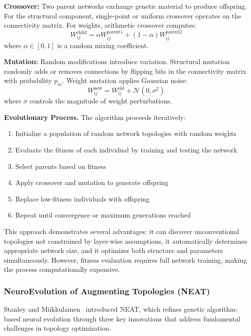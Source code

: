 \textbf{Crossover:} Two parent networks exchange genetic material to produce offspring. For the structural component, single-point or uniform crossover operates on the connectivity matrix. For weights, arithmetic crossover computes:
\begin{equation}
W_{ij}^{\text{child}} = \alpha W_{ij}^{\text{parent1}} + (1-\alpha) W_{ij}^{\text{parent2}}
\end{equation}
where $\alpha \in [0,1]$ is a random mixing coefficient.

\textbf{Mutation:} Random modifications introduce variation. Structural mutation randomly adds or removes connections by flipping bits in the connectivity matrix with probability $p_m$. Weight mutation applies Gaussian noise:
\begin{equation}
W_{ij}^{\text{new}} = W_{ij}^{\text{old}} + \mathcal{N}(0, \sigma^2)
\end{equation}
where $\sigma$ controls the magnitude of weight perturbations.

\textbf{Evolutionary Process.} The algorithm proceeds iteratively:

\begin{enumerate}
\item Initialize a population of random network topologies with random weights
\item Evaluate the fitness of each individual by training and testing the network
\item Select parents based on fitness
\item Apply crossover and mutation to generate offspring
\item Replace low-fitness individuals with offspring
\item Repeat until convergence or maximum generations reached
\end{enumerate}

This approach demonstrates several advantages: it can discover unconventional topologies not constrained by layer-wise assumptions, it automatically determines appropriate network size, and it optimizes both structure and parameters simultaneously. However, fitness evaluation requires full network training, making the process computationally expensive.

\subsubsection{NeuroEvolution of Augmenting Topologies (NEAT)}

Stanley and Miikkulainen~\cite{stanley2002evolving} introduced NEAT, which refines genetic algorithm-based neural evolution through three key innovations that address fundamental challenges in topology optimization.

